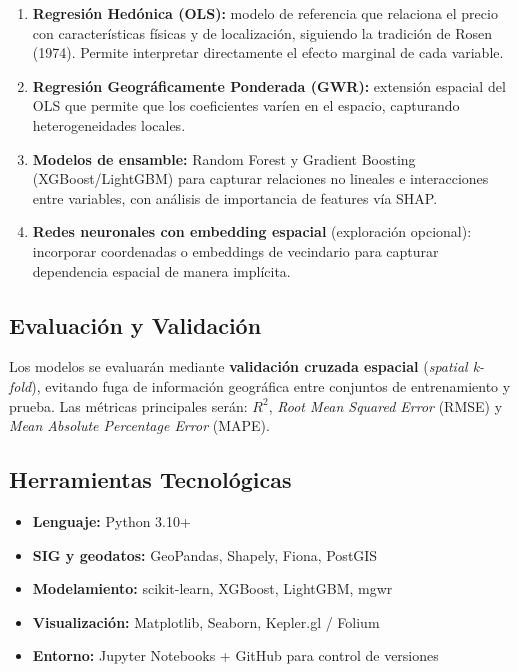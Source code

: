 \documentclass[12pt, letterpaper]{article}
\begin{document}
\begin{enumerate}[leftmargin=1.5em, itemsep=0.4em]
  \item \textbf{Regresión Hedónica (OLS):} modelo de referencia que relaciona
        el precio con características físicas y de localización, siguiendo la
        tradición de Rosen (1974). Permite interpretar directamente el efecto
        marginal de cada variable.
  \item \textbf{Regresión Geográficamente Ponderada (GWR):} extensión espacial
        del OLS que permite que los coeficientes varíen en el espacio, capturando
        heterogeneidades locales.
  \item \textbf{Modelos de ensamble:} Random Forest y Gradient Boosting
        (XGBoost/LightGBM) para capturar relaciones no lineales e interacciones
        entre variables, con análisis de importancia de features vía SHAP.
  \item \textbf{Redes neuronales con embedding espacial} (exploración opcional):
        incorporar coordenadas o embeddings de vecindario para capturar dependencia
        espacial de manera implícita.
\end{enumerate}

\subsection{Evaluación y Validación}

Los modelos se evaluarán mediante \textbf{validación cruzada espacial}
(\textit{spatial k-fold}), evitando fuga de información geográfica entre
conjuntos de entrenamiento y prueba. Las métricas principales serán:
$R^2$, \textit{Root Mean Squared Error} (RMSE) y \textit{Mean Absolute
Percentage Error} (MAPE).

\subsection{Herramientas Tecnológicas}

\begin{itemize}[leftmargin=1.5em, itemsep=0.2em]
  \item \textbf{Lenguaje:} Python 3.10+
  \item \textbf{SIG y geodatos:} GeoPandas, Shapely, Fiona, PostGIS
  \item \textbf{Modelamiento:} scikit-learn, XGBoost, LightGBM, mgwr
  \item \textbf{Visualización:} Matplotlib, Seaborn, Kepler.gl / Folium
  \item \textbf{Entorno:} Jupyter Notebooks + GitHub para control de versiones
\end{itemize}
\end{document}
